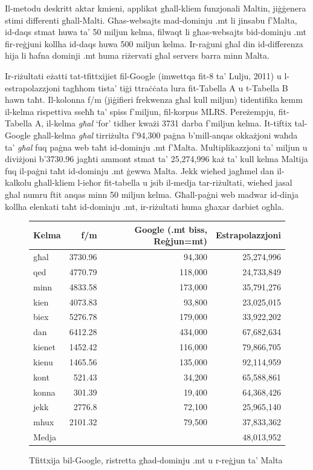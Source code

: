 \documentclass[]{../../metanetpaper}
\begin{document}
\begin{multicols}{2}
Il-metodu deskritt aktar kmieni, applikat għall-kliem funzjonali Maltin, jiġġenera stimi differenti għall-Malti. Għas-websajts mad-dominju .mt li jinsabu f'Malta, id-daqs stmat huwa ta’ 50 miljun kelma, filwaqt li għas-websajts bid-dominju .mt fir-reġjuni kollha id-daqs huwa 500 miljun kelma. Ir-raġuni għal din id-differenza hija li ħafna dominji .mt huma riżervati għal servers barra minn Malta.
    
Ir-riżultati eżatti tat-tfittxijiet fil-Google (imwettqa fit-8 ta’ Lulju, 2011) u l-estrapolazzjoni tagħhom tista’ tiġi ttraċċata lura fit-Tabella A u t-Tabella B hawn taħt. Il-kolonna f/m (jiġifieri frekwenza għal kull miljun) tidentifika kemm il-kelma rispettiva sseħħ ta’ spiss f’miljun, fil-korpus MLRS. Pereżempju, fit-Tabella A, il-kelma \emph{għal} ‘for’ tidher kważi 3731 darba f’miljun kelma. It-tiftix tal-Google għall-kelma \emph{għal} tirriżulta f’94,300 paġna b’mill-anqas okkażjoni waħda ta’ \emph{għal} fuq paġna web taħt id-dominju .mt f'Malta. Multiplikazzjoni ta’ miljun u diviżjoni b’3730.96 jagħti ammont stmat ta’ 25,274,996 każ ta’ kull kelma Maltija fuq il-paġni taħt id-dominju .mt ġewwa Malta. Jekk wieħed jagħmel dan il-kalkolu għall-kliem l-ieħor fit-tabella u jsib il-medja tar-riżultati, wieħed jasal għal numru ftit anqas minn 50 miljun kelma. Għall-paġni web madwar id-dinja kollha elenkati taħt id-dominju .mt, ir-riżultati huma għaxar darbiet ogħla.

\begin{figure}[tb]
\setlength{\tabcolsep}{2.5em}
\begin{tabularx}{\textwidth}{lrrr} \toprule\addlinespace
Kelma  & f/m & Google (.mt biss, Reġjun=mt) & Estrapolazzjoni  \\
\hline
għal & 3730.96 & 94,300 & 25,274,996 \\
qed	& 4770.79 & 118,000 & 24,733,849 \\
minn & 4833.58 & 173,000 & 35,791,276 \\
kien & 4073.83 & 93,800 & 23,025,015 \\
biex & 5276.78 & 179,000 & 33,922,202 \\
dan	& 6412.28 & 434,000 & 67,682,634 \\
kienet & 1452.42 & 116,000 & 79,866,705 \\
kienu & 1465.56 & 135,000 & 92,114,959 \\
kont & 521.43 & 34,200 & 65,588,861 \\
konna & 301.39 & 19,400 & 64,368,426 \\
jekk & 2776.8 & 72,100 & 25,965,140 \\
mhux & 2101.32 & 79,500 & 37,833,362 \\
\hline
Medja & & & 48,013,952 \\
\hline
\end{tabularx}
\caption{Tfittxija bil-Google, ristretta għad-dominju .mt u r-reġjun ta’ Malta}
\label{table:Google_A_mt}
\end{figure}


\end{multicols}
\end{document}
